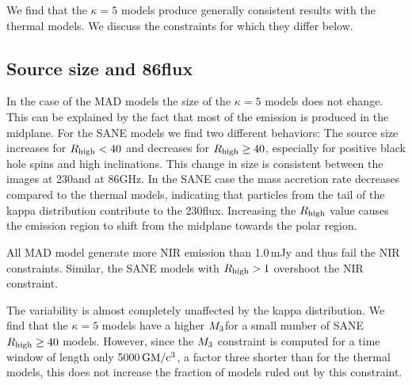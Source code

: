 We find that the $\kappa=5$ models produce generally consistent results with the \bhac thermal models. We discuss the constraints for which they differ below.
\subsection{Source size and 86\GHz flux}

In the case of the MAD models the size of the $\kappa=5$ models does not change. This can be explained by the fact that most of the emission is produced in the midplane. For the SANE models we find two different behaviors: The source size increases for $R_{\rm high}<40$ and decreases for $R_{\rm high}\geq 40$, especially for positive black hole spins and high inclinations. This change in size is consistent between the images at 230\GHz and at 86GHz. In the SANE case the mass accretion rate decreases compared to the thermal models, indicating that particles from the tail of the kappa distribution contribute to the 230\GHz flux. Increasing the $R_{\rm high}$ value causes the emission region to shift from the midplane towards the polar region.




All MAD model generate more NIR emission than 1.0\,mJy and thus fail the NIR constraints. Similar, the SANE models with $R_{\rm high}>1$ overshoot the NIR constraint.


The variability is almost completely unaffected by the kappa distribution. We find that the $\kappa=5$ models have a higher $M_{3}$for a small number of SANE $R_{\rm high}\geq 40$ models. However, since the $M_{3}$ constraint is computed for a time window of length only 5000\,$\rm{GM/c^3}$, a factor three shorter than for the thermal models, this does not increase the fraction of models ruled out by this constraint.

